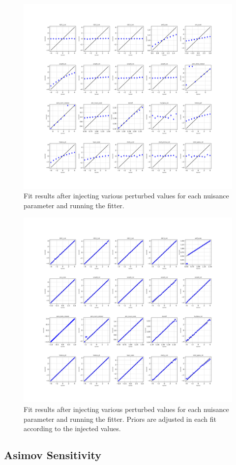 \documentclass[main.tex]{subfiles}
\begin{document}
\begin{figure}
    \centering 
    \includegraphics[width=0.7\linewidth]{figures/inject_recover_syst.png}
    \caption{Fit results after injecting various perturbed values for each nuisance parameter and running the fitter. }\label{fig:ir_nopriorpert}
\end{figure}


\begin{figure}
    \centering 
    \includegraphics[width=0.7\linewidth]{figures/inject_recover_syst_prior.png}
    \caption{Fit results after injecting various perturbed values for each nuisance parameter and running the fitter. Priors are adjusted in each fit according to the injected values.}\label{fig:ir_priorpert}
\end{figure}

\subsection{Asimov Sensitivity}
\end{document}
